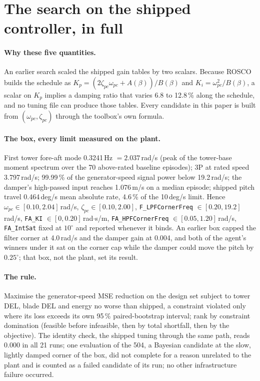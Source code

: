 \documentclass{article}
\begin{document}
\section{The search on the shipped controller, in full}
\label{app:search}
\paragraph{Why these five quantities.} An earlier search scaled the shipped gain tables by two scalars. Because ROSCO builds the schedule as $K_p=(2\zeta_{pc}\omega_{pc}+A(\beta))/B(\beta)$ and $K_i=\omega_{pc}^2/B(\beta)$, a scalar on $K_p$ implies a damping ratio that varies 6.8 to 12.8\,\% along the schedule, and no tuning file can produce those tables. Every candidate in this paper is built from $(\omega_{pc},\zeta_{pc})$ through the toolbox's own formula.

\paragraph{The box, every limit measured on the plant.} First tower fore-aft mode 0.3241\,Hz $=2.037$\,rad/s (peak of the tower-base moment spectrum over the 70 above-rated baseline episodes); 3P at rated speed 3.797\,rad/s; 99.99\,\% of the generator-speed signal power below 19.2\,rad/s; the damper's high-passed input reaches 1.076\,m/s on a median episode; shipped pitch travel 0.464\,deg/s mean absolute rate, 4.6\,\% of the 10\,deg/s limit. Hence $\omega_{pc}\in[0.10, 2.04]$\,rad/s, $\zeta_{pc}\in[0.10, 2.00]$, \texttt{F\_LPFCornerFreq} $\in[0.20, 19.2]$\,rad/s, \texttt{FA\_KI} $\in[0, 0.20]$\,rad$\cdot$s/m, \texttt{FA\_HPFCornerFreq} $\in[0.05, 1.20]$\,rad/s, \texttt{FA\_IntSat} fixed at $10^\circ$ and reported whenever it binds. An earlier box capped the filter corner at 4.0\,rad/s and the damper gain at 0.004, and both of the agent's winners under it sat on the corner cap while the damper could move the pitch by $0.25^\circ$; that box, not the plant, set its result.

\paragraph{The rule.} Maximise the generator-speed MSE reduction on the design set subject to tower DEL, blade DEL and energy no worse than shipped, a constraint violated only where its loss exceeds its own 95\,\% paired-bootstrap interval; rank by constraint domination (feasible before infeasible, then by total shortfall, then by the objective). The identity check, the shipped tuning through the same path, reads 0.000 in all 21 runs; one evaluation of the 504, a Bayesian candidate at the slow, lightly damped corner of the box, did not complete for a reason unrelated to the plant and is counted as a failed candidate of its run; no other infrastructure failure occurred.
\end{document}

